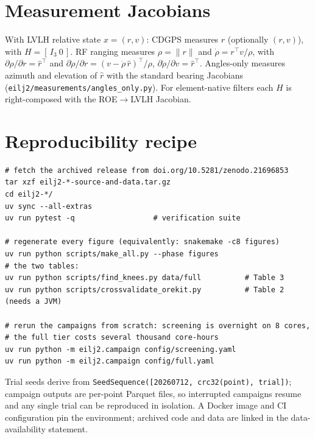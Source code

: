 \section{Measurement Jacobians}\label{app:jacobians}

With LVLH relative state $x = (r, v)$: CDGPS measures $r$ (optionally
$(r,v)$), with $H = [\,I_3\ 0\,]$. RF ranging measures
$\rho = \lVert r \rVert$ and
$\dot\rho = r^\top v / \rho$, with
$\partial\rho/\partial r = \hat{r}^\top$ and
$\partial\dot\rho/\partial r = (v - \dot\rho\,\hat{r})^\top / \rho$,
$\partial\dot\rho/\partial v = \hat{r}^\top$. Angles-only measures azimuth
and elevation of $\hat{r}$ with the standard bearing Jacobians
(\texttt{eilj2/measurements/angles\_only.py}). For element-native filters
each $H$ is right-composed with the ROE$\to$LVLH Jacobian.

\section{Reproducibility recipe}\label{app:repro}

\begin{verbatim}
# fetch the archived release from doi.org/10.5281/zenodo.21696853
tar xzf eilj2-*-source-and-data.tar.gz
cd eilj2-*/
uv sync --all-extras
uv run pytest -q                  # verification suite

# regenerate every figure (equivalently: snakemake -c8 figures)
uv run python scripts/make_all.py --phase figures
# the two tables:
uv run python scripts/find_knees.py data/full          # Table 3
uv run python scripts/crossvalidate_orekit.py          # Table 2 (needs a JVM)

# rerun the campaigns from scratch: screening is overnight on 8 cores,
# the full tier costs several thousand core-hours
uv run python -m eilj2.campaign config/screening.yaml
uv run python -m eilj2.campaign config/full.yaml
\end{verbatim}
Trial seeds derive from
\texttt{SeedSequence([20260712, crc32(point), trial])}; campaign outputs
are per-point Parquet files, so interrupted campaigns resume and any
single trial can be reproduced in isolation. A Docker image and CI
configuration pin the environment; archived code and data are linked in
the data-availability statement.
